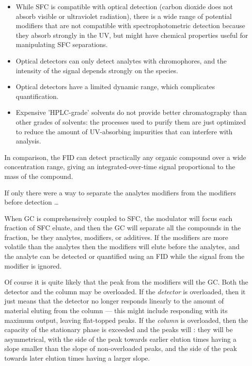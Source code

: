 \begin{itemize}

\item While SFC is compatible with optical detection (carbon dioxide does not
absorb visible or ultraviolet radiation), there is a wide range of potential
modifiers that are not compatible with spectrophotometric detection because they
absorb strongly in the UV, but might have chemical properties useful for
manipulating SFC separations. 

\item Optical detectors can only detect analytes with chromophores, and the
intensity of the signal depends strongly on the species.

\item Optical detectors have a limited dynamic range, which complicates
quantification.

\item Expensive 'HPLC-grade' solvents do not provide better chromatography than
other grades of solvents: the processes used to purify them are just optimized to
reduce the amount of UV-absorbing impurities that can interfere with analysis.

\end{itemize}

In comparison, the FID can detect practically any organic compound over a wide
concentration range, giving an integrated-over-time signal proportional to the
mass of the compound.

If only there were a way to separate the analytes modifiers from the modifiers
before detection \ldots

When GC is comprehensively coupled to SFC, the modulator will focus each
fraction of SFC eluate, and then the GC will separate all the compounds in the
fraction, be they analytes, modifiers, or additives. If the modifiers are more 
volatile than the analytes then the modifiers will elute before the analytes, and
the analyte can be detected or quantified using an FID while the signal from the
modifier is ignored.

Of course it is quite likely that the peak from the modifiers will
 the GC. Both the detector and the column may be overloaded.
If the \emph{detector} is overloaded, then it just means that the detector no
longer responds linearly to the amount of material eluting from the column ---
this might include responding with its maximum output, leaving flat-topped
peaks. If the \emph{column} is overloaded, then the capacity of the stationary
phase is exceeded and the peaks will : they will be asymmetrical,
with the side of the peak towards earlier elution times having a slope smaller
than the slope of non-overloaded peaks, and the side of the peak towards later
elution times having a larger slope.

